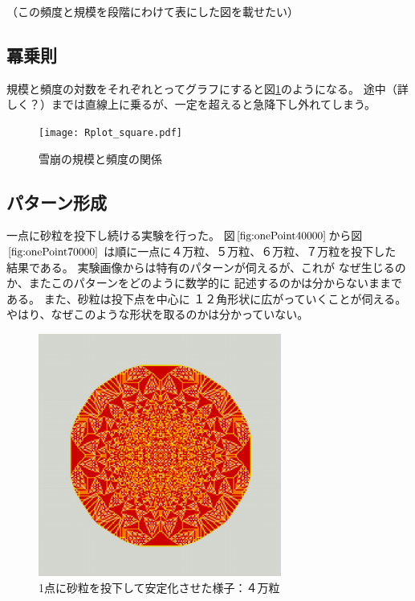 \documentclass[lualatex,12pt,ja=standard]{bxjsreport}
\begin{document}
（この頻度と規模を段階にわけて表にした図を載せたい）

\subsection{冪乗則}
規模と頻度の対数をそれぞれとってグラフにすると図\ref{fig:experiment2}のようになる。
途中（詳しく？）までは直線上に乗るが、一定を超えると急降下し外れてしまう。
\begin{figure}[H]
 \begin{center}
\texttt{[image: Rplot\_square.pdf]}
  \caption{雪崩の規模と頻度の関係}
  \label{fig:experiment2}
 \end{center}
\end{figure}

\subsection{パターン形成}
一点に砂粒を投下し続ける実験を行った。
図$\ref{fig:onePoint40000}$から図$\ref{fig:onePoint70000}$
は順に一点に４万粒、５万粒、６万粒、７万粒を投下した
結果である。
実験画像からは特有のパターンが伺えるが、これが
なぜ生じるのか、またこのパターンをどのように数学的に
記述するのかは分からないままである。
また、砂粒は投下点を中心に
１２角形状に広がっていくことが伺える。
やはり、なぜこのような形状を取るのかは分かっていない。

\begin{center}
 \begin{figure}[H]
  \begin{center}
   \includegraphics[bb=0 0 896 893,clip,width=8cm]{figures/onepoint40000.png}
  \end{center}
  \caption{1点に砂粒を投下して安定化させた様子：４万粒}
  \label{fig:onePoint40000}
 \end{figure}
\end{center}
\end{document}
